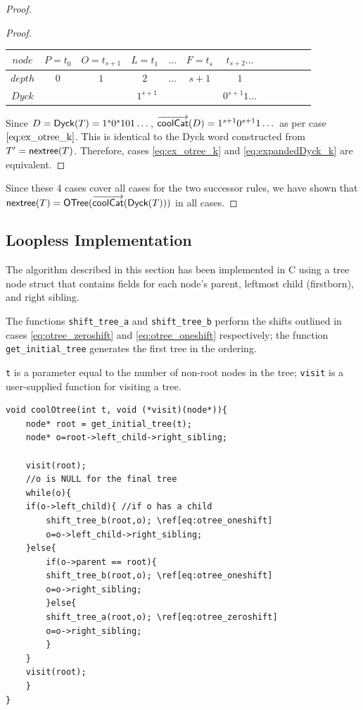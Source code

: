 \begin{proof}
\begin{proof}
\begin{center}
\begin{tabular}{ |c|c|c|c|c|c|c|c|c|c|c|c| }
	    $node$ & $P=t_0$ & $O=t_{s+1}$& $L=t_1$ & $\dots$ & $F=t_s$  & $t_{s+2}\dots$ \\
	    \hline
	    $depth$ & $0$ & $1$ & $2$ & $\dots$ & $s+1$ & $1$  \\
	    \hline
	    $Dyck$ &  &  \multicolumn{4}{|c|}{$1^{s+1}$} &  $0^{s+1}1\dots$   \\
	    \hline
	\end{tabular}
    \end{center}

Since $D=\mathsf{Dyck}{(T)}=1^s0^s101\dots$, $\overrightarrow{\mathsf{coolCat}}{(D)}=1^{s+1}0^{s+1}1\dots$ as per case $\ref{eq:ex_otree_k}$.  This is identical to the Dyck word constructed from $T'=\mathsf{nextree}{(T)}$.  Therefore, cases \ref{eq:ex_otree_k} and \ref{eq:expandedDyck_k} are equivalent.

\end{proof}

Since these 4 cases cover all cases for the two successor rules, we have shown that $\mathsf{nextree}{(T)}=\mathsf{OTree}{(\overrightarrow{\mathsf{coolCat}}{(\mathsf{Dyck}{(T)})})}$ in all cases. 
\end{proof}
\subsection{Loopless Implementation}
The algorithm described in this section has been implemented in C using a tree node struct that contains fields for each node's parent, leftmost child (firstborn), and right sibling.

The functions \verb+shift_tree_a+ and \verb+shift_tree_b+ perform the shifts outlined in cases \ref{eq:otree_zeroshift} and \ref{eq:otree_oneshift} respectively; the function \verb+get_initial_tree+ generates the first tree in the ordering.

\verb$t$ is a parameter equal to the number of non-root nodes in the tree; \verb$visit$ is a user-supplied function for visiting a tree.

\begin{Verbatim}[commandchars=\\\[\]]
void coolOtree(int t, void (*visit)(node*)){
    node* root = get_initial_tree(t);
    node* o=root->left_child->right_sibling;

    visit(root);
    //o is NULL for the final tree
    while(o){ 
	if(o->left_child){ //if o has a child
	    shift_tree_b(root,o); \ref[eq:otree_oneshift]
	    o=o->left_child->right_sibling;
	}else{
	    if(o->parent == root){ 
		shift_tree_b(root,o); \ref[eq:otree_oneshift] 
		o=o->right_sibling;
	    }else{ 
		shift_tree_a(root,o); \ref[eq:otree_zeroshift]
		o=o->right_sibling;
	    }
	}
	visit(root);
    }
}
\end{Verbatim}

